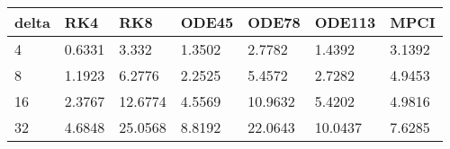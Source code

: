 \begin{tabular}{lllllll}
delta & RK4 & RK8 & ODE45 & ODE78 & ODE113 & MPCI \\ 
\hline 
4 & 0.6331 & 3.332 & 1.3502 & 2.7782 & 1.4392 & 3.1392 \\ 
8 & 1.1923 & 6.2776 & 2.2525 & 5.4572 & 2.7282 & 4.9453 \\ 
16 & 2.3767 & 12.6774 & 4.5569 & 10.9632 & 5.4202 & 4.9816 \\ 
32 & 4.6848 & 25.0568 & 8.8192 & 22.0643 & 10.0437 & 7.6285 \\ 
\hline 
\end{tabular}